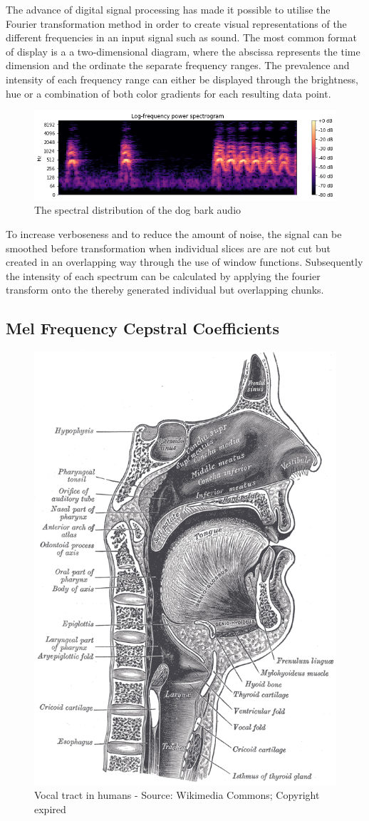 The advance of digital signal processing has made it possible to utilise the Fourier transformation method in order to create visual representations of the different frequencies in an input signal such as sound. The most common format of display is a a two-dimensional diagram, where the abscissa represents the time dimension and the ordinate the separate frequency ranges. The prevalence and intensity of each frequency range can either be displayed through the brightness, hue or a combination of both color gradients for each resulting data point. 


\begin{figure}[h]
    \centering
	\includegraphics[width=\textwidth]{./images/illustrations/spectrogram}
    \caption{The spectral distribution of the dog bark audio}
    \label{fig:spef}
\end{figure}



To increase verboseness and to reduce the amount of noise, the signal can be smoothed before transformation when individual slices are are not cut but created in an overlapping way through the use of window functions. Subsequently the intensity of each spectrum can be calculated by applying the fourier transform onto the thereby generated individual but overlapping chunks.


\subsection{Mel Frequency Cepstral Coefficients}
\label{MFCC}


\begin{figure}
    \centering
	\includegraphics[width=.375\textwidth]{./images/illustrations/Sagittalmouth}
    \caption{Vocal tract in humans - Source: Wikimedia Commons; Copyright expired}
    \label{fig: Sagittalmouth}
\end{figure}



